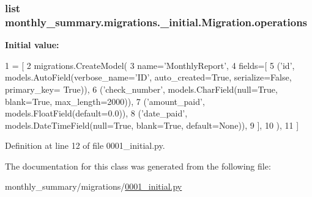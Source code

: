 \hypertarget{classmonthly__summary_1_1migrations_1_10001__initial_1_1Migration_a00ae68eb78cb0d5e03b889b9a8398b15}{
\subsubsection[{operations}]{\setlength{\rightskip}{0pt plus 5cm}list monthly\-\_\-summary.\-migrations.\-\_\-initial.\-Migration.\-operations\hspace{0.3cm}{\ttfamily [static]}}}\label{classmonthly__summary_1_1migrations_1_10001__initial_1_1Migration_a00ae68eb78cb0d5e03b889b9a8398b15}
{\bfseries Initial value\-:}
\begin{DoxyCode}
1 = [
2         migrations.CreateModel(
3             name=\textcolor{stringliteral}{'MonthlyReport'},
4             fields=[
5                 (\textcolor{stringliteral}{'id'}, models.AutoField(verbose\_name=\textcolor{stringliteral}{'ID'}, auto\_created=\textcolor{keyword}{True}, serialize=\textcolor{keyword}{False}, primary\_key=\textcolor{keyword}{
      True})),
6                 (\textcolor{stringliteral}{'check\_number'}, models.CharField(null=\textcolor{keyword}{True}, blank=\textcolor{keyword}{True}, max\_length=2000)),
7                 (\textcolor{stringliteral}{'amount\_paid'}, models.FloatField(default=0.0)),
8                 (\textcolor{stringliteral}{'date\_paid'}, models.DateTimeField(null=\textcolor{keyword}{True}, blank=\textcolor{keyword}{True}, default=\textcolor{keywordtype}{None})),
9             ],
10         ),
11     ]
\end{DoxyCode}


Definition at line 12 of file 0001\-\_\-initial.\-py.



The documentation for this class was generated from the following file\-:\begin{DoxyCompactItemize}
\item 
monthly\-\_\-summary/migrations/\hyperlink{monthly__summary_2migrations_20001__initial_8py}{0001\-\_\-initial.\-py}\end{DoxyCompactItemize}
